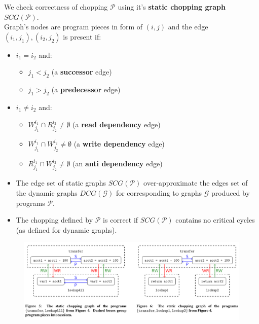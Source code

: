 \documentclass{beamer}
\begin{document}
\begin{frame}
	We check correctness of chopping $\mathcal{P}$ using it's \textbf{static chopping graph} $SCG(\mathcal{P})$.\\
	Graph's nodes are program pieces in form of $(i, j)$ and the edge $(i_1, j_1), (i_2, j_2)$ is present if:
	\begin{itemize}
		\item $i_1 = i_2$ and:
		\begin{itemize}
			\item $j_1 < j_2$ (a \textbf{successor} edge)
			\item $j_1 > j_2$ (a \textbf{predecessor} edge)
		\end{itemize}
		\item $i_1 \ne i_2$ and:
		\begin{itemize}
			\item $W^{i_1}_{j_1}\cap R^{i_2}_{j_2} \ne \emptyset$ (a \textbf{read dependency} edge)
			\item $W^{i_1}_{j_1}\cap W^{i_2}_{j_2} \ne \emptyset$ (a \textbf{write dependency} edge)
			\item $R^{i_1}_{j_1}\cap W^{i_2}_{j_2} \ne \emptyset$ (an \textbf{anti dependency} edge)
		\end{itemize}
	\end{itemize}
\end{frame}

\begin{frame}
	\begin{itemize}
		\item The edge set of static graphs $SCG(\mathcal{P})$ over-approximate the edges set of the dynamic graphs $DCG(\mathcal{G})$ for corresponding to graphs $\mathcal{G}$ produced by programs $\mathcal{P}$.
		\item The chopping defined by $\mathcal{P}$ is correct if $SCG(\mathcal{P})$ contains no critical cycles (as defined for dynamic graphs).
	\end{itemize}
\end{frame}

\begin{frame}
	\begin{figure}
		\includegraphics[scale=0.28]{fig56}
	\end{figure}
\end{frame}
\end{document}
